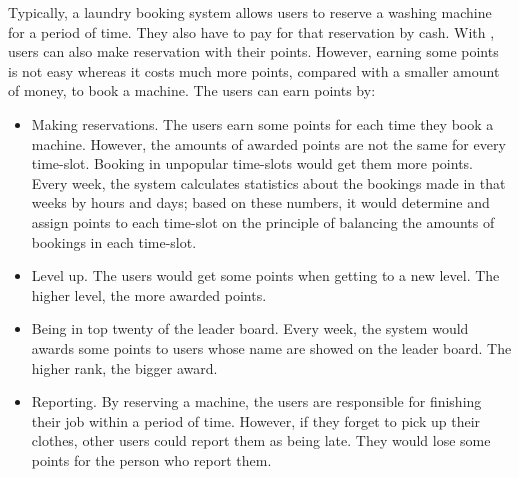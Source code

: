Typically, a laundry booking system allows users to reserve a washing machine for a period of time. They also have to pay for that reservation by cash. With {\toolname}, users can also make reservation with their points. However, earning some points is not easy whereas it costs much more points, compared with a smaller amount of money, to book a machine. The users can earn points by:
\begin{itemize}
\item Making reservations. The users earn some points for each time they book a machine. However, the amounts of awarded points are not the same for every time-slot. Booking in unpopular time-slots would get them more points. Every week, the system calculates statistics about the bookings made in that weeks by hours and days; based on these numbers, it would determine and assign points to each time-slot on the principle of balancing the amounts of bookings in each time-slot.
\item Level up. The users would get some points when getting to a new level. The higher level, the more awarded points.
\item Being in top twenty of the leader board. Every week, the system would awards some points to users whose name are showed on the leader board. The higher rank, the bigger award.
\item Reporting. By reserving a machine, the users are responsible for finishing their job within a period of time. However, if they forget to pick up their clothes, other users could report them as being late. They would lose some points for the person who report them.
\end{itemize}